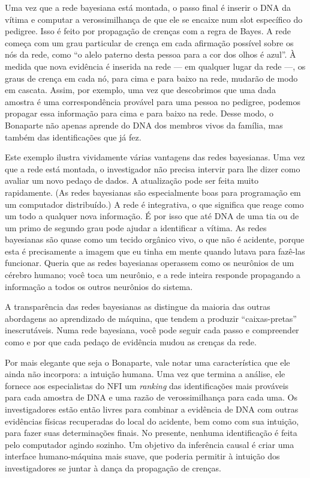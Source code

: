 \documentclass[11pt,a5paper,twoside]{book}
\begin{document}
Uma vez que a rede bayesiana está montada, o passo final é inserir o DNA da vítima e computar a verossimilhança de que ele se encaixe num slot específico do pedigree. Isso é feito por propagação de crenças com a regra de Bayes. A rede começa com um grau particular de crença em cada afirmação possível sobre os nós da rede, como “o alelo paterno desta pessoa para a cor dos olhos é azul”. À medida que nova evidência é inserida na rede — em qualquer lugar da rede —, os graus de crença em cada nó, para cima e para baixo na rede, mudarão de modo em cascata. Assim, por exemplo, uma vez que descobrimos que uma dada amostra é uma correspondência provável para uma pessoa no pedigree, podemos propagar essa informação para cima e para baixo na rede. Desse modo, o Bonaparte não apenas aprende do DNA dos membros vivos da família, mas também das identificações que já fez.

Este exemplo ilustra vividamente várias vantagens das redes bayesianas. Uma vez que a rede está montada, o investigador não precisa intervir para lhe dizer como avaliar um novo pedaço de dados. A atualização pode ser feita muito rapidamente. (As redes bayesianas são especialmente boas para programação em um computador distribuído.) A rede é integrativa, o que significa que reage como um todo a qualquer nova informação. É por isso que até DNA de uma tia ou de um primo de segundo grau pode ajudar a identificar a vítima. As redes bayesianas são quase como um tecido orgânico vivo, o que não é acidente, porque esta é precisamente a imagem que eu tinha em mente quando lutava para fazê-las funcionar. Queria que as redes bayesianas operassem como os neurônios de um cérebro humano; você toca um neurônio, e a rede inteira responde propagando a informação a todos os outros neurônios do sistema.

A transparência das redes bayesianas as distingue da maioria das outras abordagens ao aprendizado de máquina, que tendem a produzir “caixas-pretas” inescrutáveis. Numa rede bayesiana, você pode seguir cada passo e compreender como e por que cada pedaço de evidência mudou as crenças da rede.

Por mais elegante que seja o Bonaparte, vale notar uma característica que ele ainda não incorpora: a intuição humana. Uma vez que termina a análise, ele fornece aos especialistas do NFI um \textit{ranking} das identificações mais prováveis para cada amostra de DNA e uma razão de verossimilhança para cada uma. Os investigadores estão então livres para combinar a evidência de DNA com outras evidências físicas recuperadas do local do acidente, bem como com sua intuição, para fazer suas determinações finais. No presente, nenhuma identificação é feita pelo computador agindo sozinho. Um objetivo da inferência causal é criar uma interface humano-máquina mais suave, que poderia permitir à intuição dos investigadores se juntar à dança da propagação de crenças.
\end{document}
